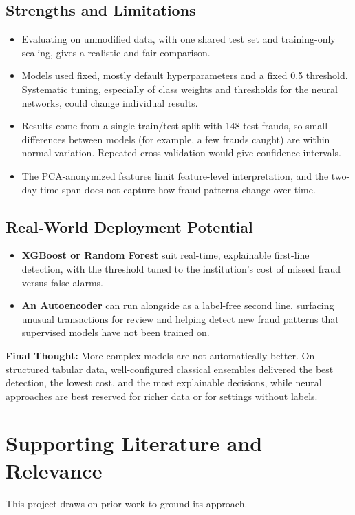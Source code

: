 \documentclass[journal]{IEEEtran}
\begin{document}
\subsection{Strengths and Limitations}
\begin{itemize}
  \item Evaluating on unmodified data, with one shared test set and training-only scaling, gives a realistic and fair comparison.
  \item Models used fixed, mostly default hyperparameters and a fixed 0.5 threshold. Systematic tuning, especially of class weights and thresholds for the neural networks, could change individual results.
  \item Results come from a single train/test split with 148 test frauds, so small differences between models (for example, a few frauds caught) are within normal variation. Repeated cross-validation would give confidence intervals.
  \item The PCA-anonymized features limit feature-level interpretation, and the two-day time span does not capture how fraud patterns change over time.
\end{itemize}

\subsection{Real-World Deployment Potential}
\begin{itemize}
  \item \textbf{XGBoost or Random Forest} suit real-time, explainable first-line detection, with the threshold tuned to the institution's cost of missed fraud versus false alarms.
  \item \textbf{An Autoencoder} can run alongside as a label-free second line, surfacing unusual transactions for review and helping detect new fraud patterns that supervised models have not been trained on.
\end{itemize}

\textbf{Final Thought:} More complex models are not automatically better. On structured tabular data, well-configured classical ensembles delivered the best detection, the lowest cost, and the most explainable decisions, while neural approaches are best reserved for richer data or for settings without labels.

\section{Supporting Literature and Relevance}
This project draws on prior work to ground its approach.
\end{document}

